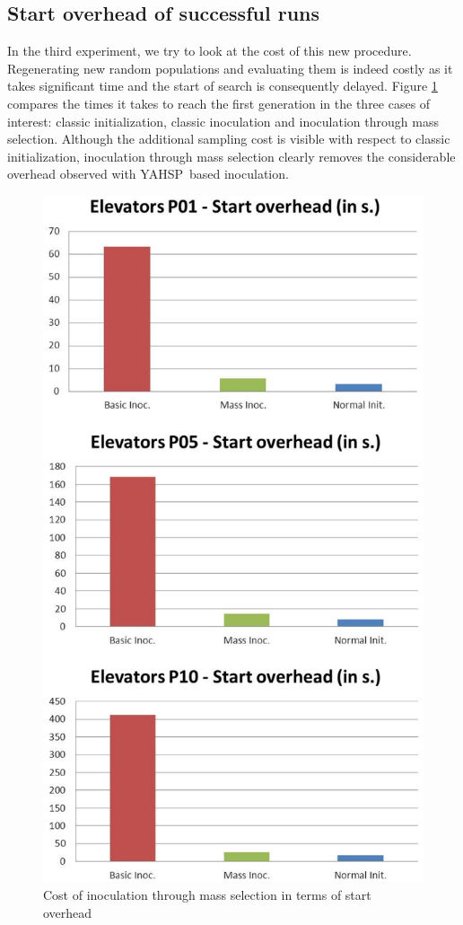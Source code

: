 \documentclass[english]{DESCARWINreport}
\newcommand{\YAHSP}{{\sc YAHSP}}
\begin{document}
\subsection{Start overhead of successful runs}

In the third experiment, we try to look at the cost of this new procedure. Regenerating new random populations and evaluating them is indeed costly as it takes significant time and the start of search is consequently delayed. Figure \ref{fig:overhead} compares the times it takes to reach the first generation in the three cases of interest: classic initialization, classic inoculation and inoculation through mass selection. Although the additional sampling cost is visible with respect to classic initialization, inoculation through mass selection clearly removes the considerable overhead observed with \YAHSP\ based inoculation.

\begin{figure}
	\centering
		\includegraphics[height=0.8\textheight]{pics/overhead_elevators.eps}
	\caption{Cost of inoculation through mass selection in terms of start overhead}
	\label{fig:overhead}
\end{figure}
\end{document}
